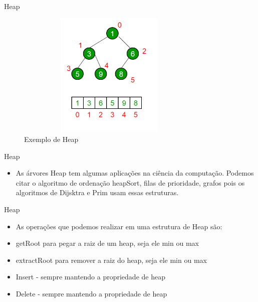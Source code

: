 \begin{frame}
	\begin{block}{Heap}
		\begin{figure}[!htb]
			\centering	  				
			\includegraphics[height=6cm, width = 9cm]{./pic/binaryheap.png}
			\caption{Exemplo de Heap \cite{GEEKS_2018}}
		\end{figure}
	\end{block}
\end{frame}


\begin{frame}
	\begin{block}{Heap}
		\begin{itemize}
			\item As árvores Heap tem algumas aplicações na ciência da computação. Podemos citar o algoritmo de ordenação heapSort, filas de prioridade, grafos pois os algoritmos de Dijsktra e Prim usam essas estruturas.
		\end{itemize}
	\end{block}
\end{frame}


\begin{frame}
	\begin{block}{Heap}
		\begin{itemize}
			\item As operações que podemos realizar em uma estrutura de Heap são:
			\item getRoot para pegar a raiz de um heap, seja ele min ou max
			\item extractRoot para remover a raiz do heap, seja ele min ou max
			\item Insert - sempre mantendo a propriedade de heap 
			\item Delete - sempre mantendo a propriedade de heap 
		\end{itemize}
	\end{block}
\end{frame}


